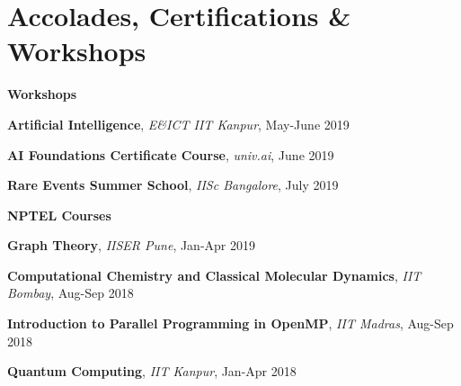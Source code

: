 \documentclass[letterpaper]{deedy-resume} %
\begin{document}
\begin{minipage}[t]{0.63\textwidth}
	\section{Accolades, Certifications \& Workshops}
	{\small
		\textbf{Workshops\\}
		\begin{tightitemize}
			\item \textbf{Artificial Intelligence}, \textit{E\&ICT IIT Kanpur}, May-June 2019
			\item \textbf{AI Foundations Certificate Course}, \textit{univ.ai}, June 2019
			\item \textbf{Rare Events Summer School}, \textit{IISc Bangalore}, July 2019
		\end{tightitemize}
		\textbf{NPTEL Courses\\}
		\begin{tightitemize}
			\item \textbf{Graph Theory}, \textit{IISER Pune}, Jan-Apr 2019
			\item \textbf{Computational Chemistry and Classical Molecular Dynamics}, \textit{IIT Bombay}, Aug-Sep 2018
			\item \textbf{Introduction to Parallel Programming in OpenMP}, \textit{IIT Madras}, Aug-Sep 2018
			\item \textbf{Quantum Computing}, \textit{IIT Kanpur}, Jan-Apr 2018
		\end{tightitemize}
	}








\end{minipage}
\end{document}
